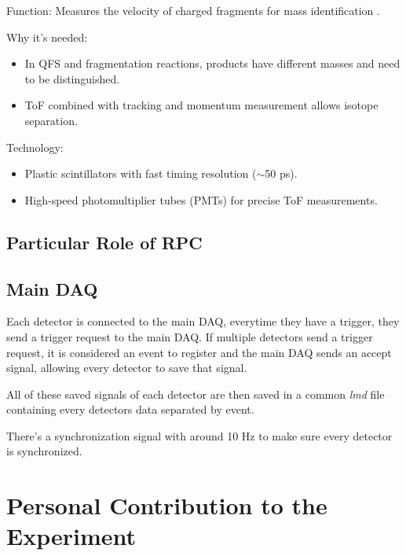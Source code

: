 Function: Measures the velocity of charged fragments for mass identification \cite{heil_new_2022}.

Why it’s needed:

\begin{itemize}
	\item In QFS and fragmentation reactions, products have different masses and need to be distinguished.
	\item ToF combined with tracking and momentum measurement allows isotope separation.
\end{itemize}

Technology:

\begin{itemize}
	\item Plastic scintillators with fast timing resolution ($\sim$50 ps).
	\item High-speed photomultiplier tubes (PMTs) for precise ToF measurements.
\end{itemize}



\subsection{Particular Role of RPC}

\cite{xarepe_resistive_2023}


\subsection{Main DAQ}

Each detector is connected to the main \gls{DAQ}, everytime they have a trigger, they send a trigger request to the main \gls{DAQ}. If multiple detectors send a trigger request, it is considered an event to register and the main \gls{DAQ} sends an accept signal, allowing every detector to save that signal.

All of these saved signals of each detector are then saved in a common \textit{lmd} file containing every detectors data separated by event.

There's a synchronization signal with around 10 Hz to make sure every detector is synchronized.


\section{Personal Contribution to the Experiment}